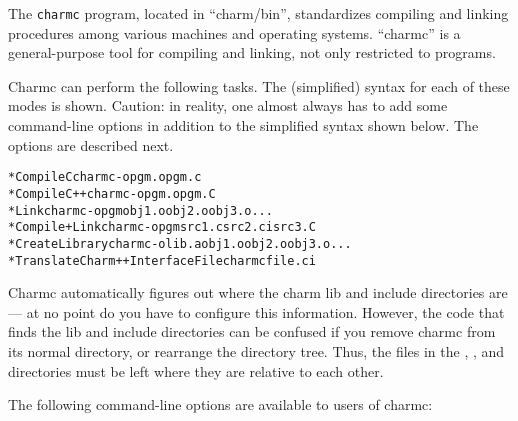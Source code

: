 The {\tt charmc} program, located in ``charm/bin'', standardizes 
compiling and linking procedures
among various machines and operating systems.  ``charmc'' is
a general-purpose tool for compiling and
linking, not only restricted to \charmpp{} programs.

Charmc can perform the following tasks.  The (simplified) syntax for
each of these modes is shown.  Caution: in reality, one almost always
has to add some command-line options in addition to the simplified
syntax shown below.  The options are described next.

\begin{alltt}
 * Compile C                            charmc -o pgm.o pgm.c
 * Compile C++                          charmc -o pgm.o pgm.C
 * Link                                 charmc -o pgm   obj1.o obj2.o obj3.o...
 * Compile + Link                       charmc -o pgm   src1.c src2.ci src3.C
 * Create Library                       charmc -o lib.a obj1.o obj2.o obj3.o...
 * Translate Charm++ Interface File     charmc file.ci
\end{alltt}

Charmc automatically figures out where the charm lib and include
directories are --- at no point do you have to configure this
information.  However, the code that finds the lib and include
directories can be confused if you remove charmc from its normal
directory, or rearrange the directory tree.  Thus, the files in the
, , and  directories 
must be left where they are relative to each other.  

The following command-line options are available to users of charmc:

